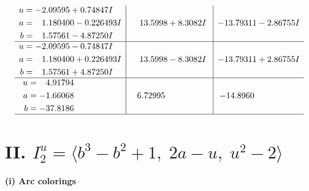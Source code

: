 \documentclass[1p]{elsarticle_modified}
\theoremstyle{definition}
\begin{document}
$$\begin{array}{c|c|c}
\begin{aligned}
u &= -2.09595 + 0.74847 I \\
a &= \phantom{-}1.180400 - 0.226493 I \\
b &= \phantom{-}1.57561 - 4.87250 I\end{aligned}
 & \phantom{-}13.5998 + 8.3082 I & -13.79311 - 2.86755 I \\ \hline\begin{aligned}
u &= -2.09595 - 0.74847 I \\
a &= \phantom{-}1.180400 + 0.226493 I \\
b &= \phantom{-}1.57561 + 4.87250 I\end{aligned}
 & \phantom{-}13.5998 - 8.3082 I & -13.79311 + 2.86755 I \\ \hline\begin{aligned}
u &= \phantom{-}4.91794\phantom{ +0.000000I} \\
a &= -1.66068\phantom{ +0.000000I} \\
b &= -37.8186\phantom{ +0.000000I}\end{aligned}
 & \phantom{-}6.72995\phantom{ +0.000000I} & -14.8960\phantom{ +0.000000I}\\
 \hline 
 \end{array}$$\newpage\newpage\renewcommand{\arraystretch}{1}
\centering \section*{II. $I^u_{2}= \langle b^3- b^2+1,\;2 a- u,\;u^2-2 \rangle$}
\flushleft \textbf{(i) Arc colorings}\\
\end{document}
